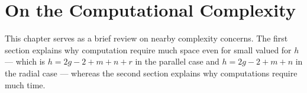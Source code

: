 \chapter{On the Computational Complexity}
\label{complexity}
This chapter serves as a brief review on nearby complexity concerns.
The first section explains why computation require much space even for small valued for $h$ --- which is $h = 2g-2+m+n+r$ in the parallel case and $h=2g-2+m+n$ in the radial case ---
whereas the second section explains why computations require much time.


